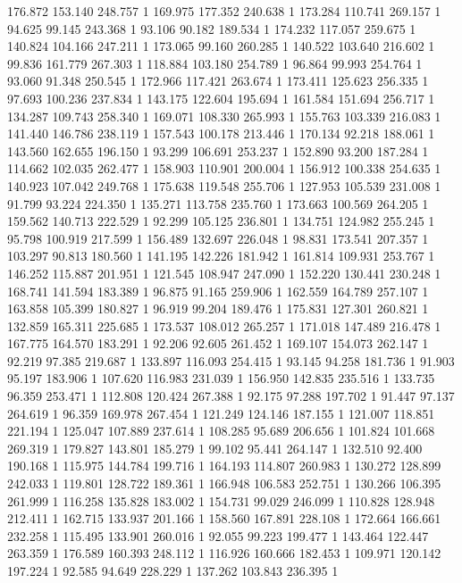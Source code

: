 	176.872	153.140	248.757	1
	169.975	177.352	240.638	1
	173.284	110.741	269.157	1
	94.625	99.145	243.368	1
	93.106	90.182	189.534	1
	174.232	117.057	259.675	1
	140.824	104.166	247.211	1
	173.065	99.160	260.285	1
	140.522	103.640	216.602	1
	99.836	161.779	267.303	1
	118.884	103.180	254.789	1
	96.864	99.993	254.764	1
	93.060	91.348	250.545	1
	172.966	117.421	263.674	1
	173.411	125.623	256.335	1
	97.693	100.236	237.834	1
	143.175	122.604	195.694	1
	161.584	151.694	256.717	1
	134.287	109.743	258.340	1
	169.071	108.330	265.993	1
	155.763	103.339	216.083	1
	141.440	146.786	238.119	1
	157.543	100.178	213.446	1
	170.134	92.218	188.061	1
	143.560	162.655	196.150	1
	93.299	106.691	253.237	1
	152.890	93.200	187.284	1
	114.662	102.035	262.477	1
	158.903	110.901	200.004	1
	156.912	100.338	254.635	1
	140.923	107.042	249.768	1
	175.638	119.548	255.706	1
	127.953	105.539	231.008	1
	91.799	93.224	224.350	1
	135.271	113.758	235.760	1
	173.663	100.569	264.205	1
	159.562	140.713	222.529	1
	92.299	105.125	236.801	1
	134.751	124.982	255.245	1
	95.798	100.919	217.599	1
	156.489	132.697	226.048	1
	98.831	173.541	207.357	1
	103.297	90.813	180.560	1
	141.195	142.226	181.942	1
	161.814	109.931	253.767	1
	146.252	115.887	201.951	1
	121.545	108.947	247.090	1
	152.220	130.441	230.248	1
	168.741	141.594	183.389	1
	96.875	91.165	259.906	1
	162.559	164.789	257.107	1
	163.858	105.399	180.827	1
	96.919	99.204	189.476	1
	175.831	127.301	260.821	1
	132.859	165.311	225.685	1
	173.537	108.012	265.257	1
	171.018	147.489	216.478	1
	167.775	164.570	183.291	1
	92.206	92.605	261.452	1
	169.107	154.073	262.147	1
	92.219	97.385	219.687	1
	133.897	116.093	254.415	1
	93.145	94.258	181.736	1
	91.903	95.197	183.906	1
	107.620	116.983	231.039	1
	156.950	142.835	235.516	1
	133.735	96.359	253.471	1
	112.808	120.424	267.388	1
	92.175	97.288	197.702	1
	91.447	97.137	264.619	1
	96.359	169.978	267.454	1
	121.249	124.146	187.155	1
	121.007	118.851	221.194	1
	125.047	107.889	237.614	1
	108.285	95.689	206.656	1
	101.824	101.668	269.319	1
	179.827	143.801	185.279	1
	99.102	95.441	264.147	1
	132.510	92.400	190.168	1
	115.975	144.784	199.716	1
	164.193	114.807	260.983	1
	130.272	128.899	242.033	1
	119.801	128.722	189.361	1
	166.948	106.583	252.751	1
	130.266	106.395	261.999	1
	116.258	135.828	183.002	1
	154.731	99.029	246.099	1
	110.828	128.948	212.411	1
	162.715	133.937	201.166	1
	158.560	167.891	228.108	1
	172.664	166.661	232.258	1
	115.495	133.901	260.016	1
	92.055	99.223	199.477	1
	143.464	122.447	263.359	1
	176.589	160.393	248.112	1
	116.926	160.666	182.453	1
	109.971	120.142	197.224	1
	92.585	94.649	228.229	1
	137.262	103.843	236.395	1
